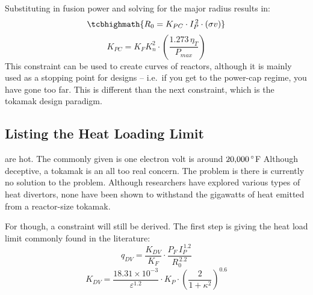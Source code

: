 Substituting in fusion power and solving for the major radius results in:
\begin{equation}
	\label{eq:r_pcap}
	\tcbhighmath{ R_0 = K_{PC} \cdot I_P^{\,2} \cdot (\sigma v) }
\end{equation}
\begin{equation}
	K_{PC} = K_F K_n^2 \cdot \left( \frac{ 1.273 \, \eta_T }{ P_{max} } \right)
\end{equation}
This  constraint can be used to create curves of reactors, although it is mainly used as a stopping point for designs -- i.e.\ if you get to the power-cap regime, you have gone too far. This is different than the next constraint, which is  the  tokamak design paradigm.
\subsection{Listing the Heat Loading Limit}

 are hot. The commonly given  is one electron volt is around $20\textnormal{,}000 \, {}^\circ$F Although  deceptive,  a tokamak is an all too real concern. The problem is there is currently no solution to the problem. Although researchers have explored various types of heat divertors, none have been shown to withstand the gigawatts of heat emitted from a reactor-size tokamak.

 For  though, a  constraint will still be derived. The first step is giving the heat load limit commonly found in the literature: \cite{minervini}
\begin{equation}
  q_{DV} = \frac{ K_{DV} }{ K_F} \cdot \frac{ P_F \, I_P^{\,1.2} }{ R_0^{\,2.2} }
\end{equation}
\begin{equation}
	K_{DV} = \frac{18.31 \times 10^{-3}}{\varepsilon^{1.2}} \cdot K_P \cdot \left( \frac{2}{1+\kappa^2} \right) ^ {0.6}
\end{equation}

